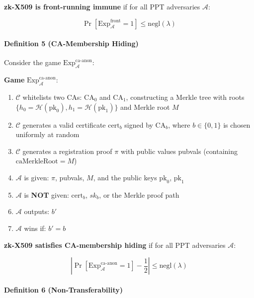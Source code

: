 \documentclass[11pt, a4paper]{article}
\begin{document}
\textbf{zk-X509 is front-running immune} if for all PPT adversaries
\(\mathcal{A}\):

\[\Pr[\text{Exp}_{\mathcal{A}}^{\text{front}} = 1] \leq \text{negl}(\lambda)\]

\paragraph{Definition 5 (CA-Membership
Hiding)}\label{definition-5-ca-membership-hiding}

Consider the game \(\text{Exp}_{\mathcal{A}}^{\text{ca-anon}}\):

\begin{mdframed}[linewidth=0.5pt, innertopmargin=6pt, innerbottommargin=6pt]
\small
\textbf{Game} $\text{Exp}_{\mathcal{A}}^{\text{ca-anon}}$:
\begin{enumerate}[nosep,leftmargin=1.5em]
\item $\mathcal{C}$ whitelists two CAs: $\text{CA}_0$ and $\text{CA}_1$, constructing a Merkle tree with roots $\{h_0 = \mathcal{H}(\text{pk}_0), h_1 = \mathcal{H}(\text{pk}_1)\}$ and Merkle root $M$
\item $\mathcal{C}$ generates a valid certificate $\text{cert}_b$ signed by $\text{CA}_b$, where $b \in \{0, 1\}$ is chosen uniformly at random
\item $\mathcal{C}$ generates a registration proof $\pi$ with public values pubvals (containing $\text{caMerkleRoot} = M$)
\item $\mathcal{A}$ is given: $\pi$, pubvals, $M$, and the public keys $\text{pk}_0$, $\text{pk}_1$
\item $\mathcal{A}$ is \textbf{NOT} given: $\text{cert}_b$, $sk_b$, or the Merkle proof path
\item $\mathcal{A}$ outputs: $b'$
\item $\mathcal{A}$ wins if: $b' = b$
\end{enumerate}
\end{mdframed}

\textbf{zk-X509 satisfies CA-membership hiding} if for all PPT
adversaries \(\mathcal{A}\):

\[\left| \Pr[\text{Exp}_{\mathcal{A}}^{\text{ca-anon}} = 1] - \frac{1}{2} \right| \leq \text{negl}(\lambda)\]

\paragraph{Definition 6
(Non-Transferability)}\label{definition-6-non-transferability}
\end{document}
